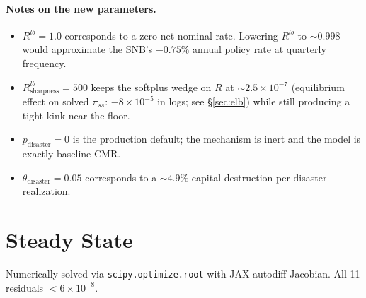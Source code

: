 \documentclass[11pt]{article}
\begin{document}
\paragraph{Notes on the new parameters.}
\begin{itemize}
\item $R^{lb} = 1.0$ corresponds to a zero net nominal rate. Lowering
  $R^{lb}$ to $\sim 0.998$ would approximate the SNB's $-0.75\%$ annual
  policy rate at quarterly frequency.
\item $R^{lb}_{\text{sharpness}} = 500$ keeps the softplus wedge on $R$
  at ${\sim}2.5\times 10^{-7}$ (equilibrium effect on solved
  $\pi_{ss}$: $-8\times 10^{-5}$ in logs; see \S\ref{sec:elb}) while
  still producing a tight kink near the floor.
\item $p_{\text{disaster}} = 0$ is the production default; the
  mechanism is inert and the model is exactly baseline CMR.
\item $\theta_{\text{disaster}} = 0.05$ corresponds to a ${\sim}4.9\%$
  capital destruction per disaster realization.
\end{itemize}


\section{Steady State}
\label{sec:steady_state}

Numerically solved via \texttt{scipy.optimize.root} with JAX autodiff Jacobian.
All 11 residuals $< 6\times 10^{-8}$.
\end{document}
